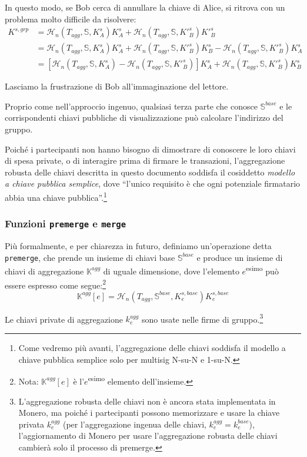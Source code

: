 In questo modo, se Bob cerca di annullare la chiave di Alice, si ritrova con un problema molto difficile da risolvere:\vspace{.175cm}
\begin{align*}
    K^{s,grp} &= \mathcal{H}_n(T_{agg},\mathbb{S},K^{s}_A)K^{s}_A + \mathcal{H}_n(T_{agg},\mathbb{S},K'^{s}_B)K'^{s}_B \\
             &= \mathcal{H}_n(T_{agg},\mathbb{S},K^{s}_A)K^{s}_A + \mathcal{H}_n(T_{agg},\mathbb{S},K'^{s}_B)K^{s}_B - \mathcal{H}_n(T_{agg},\mathbb{S},K'^{s}_B)K^{s}_A \\
             &= [\mathcal{H}_n(T_{agg},\mathbb{S},K^{s}_A) - \mathcal{H}_n(T_{agg},\mathbb{S},K'^{s}_B)]K^{s}_A + \mathcal{H}_n(T_{agg},\mathbb{S},K'^{s}_B)K^{s}_B
\end{align*}

Lasciamo la frustrazione di Bob all'immaginazione del lettore.

Proprio come nell'approccio ingenuo, qualsiasi terza parte che conosce $\mathbb{S}^{base}$ e le corrispondenti chiavi pubbliche di visualizzazione può calcolare l'indirizzo del gruppo.

Poiché i partecipanti non hanno bisogno di dimostrare di conoscere le loro chiavi di spesa private, o di interagire prima di firmare le transazioni, l'aggregazione robusta delle chiavi descritta in questo documento soddisfa il cosiddetto \emph{modello a chiave pubblica semplice}, dove ``l'unico requisito è che ogni potenziale firmatario abbia una chiave pubblica''\cite{maxwell2018simple-musig}.\footnote{Come vedremo più avanti, l'aggregazione delle chiavi soddisfa il modello a chiave pubblica semplice solo per multisig N-su-N e 1-su-N.}

\subsubsection*{Funzioni {\tt premerge} e {\tt merge}}

Più formalmente, e per chiarezza in futuro, definiamo un'operazione detta {\tt premerge}, che prende un insieme di chiavi base $\mathbb{S}^{base}$ e produce un insieme di chiavi di aggregazione $\mathbb{K}^{agg}$ di uguale dimensione, dove l'elemento $e$\textsuperscript{esimo} può essere espresso come segue:\footnote{Nota: $\mathbb{K}^{agg}[e]$ è l'$e$\textsuperscript{esimo} elemento dell'insieme.}
\[\mathbb{K}^{agg}[e] = \mathcal{H}_n(T_{agg},\mathbb{S}^{base},K^{s,base}_e)K^{s,base}_e\]

Le chiavi private di aggregazione $k^{agg}_e$ sono usate nelle firme di gruppo.\footnote{L'aggregazione robusta delle chiavi non è ancora stata implementata in Monero, ma poiché i partecipanti possono memorizzare e usare la chiave privata $k^{agg}_e$ (per l'aggregazione ingenua delle chiavi, $k^{agg}_e = k^{base}_e$), l'aggiornamento di Monero per usare l'aggregazione robusta delle chiavi cambierà solo il processo di premerge.}

